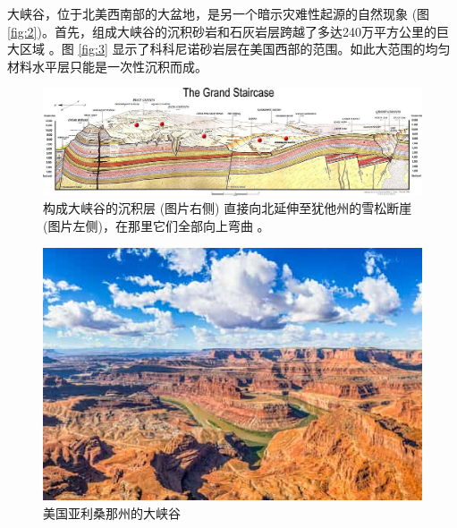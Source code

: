 \documentclass[10pt,twocolumn,letterpaper]{article}
\begin{document}
大峡谷，位于北美西南部的大盆地，是另一个暗示灾难性起源的自然现象 (图 \ref{fig:2})。首先，组成大峡谷的沉积砂岩和石灰岩层跨越了多达240万平方公里的巨大区域 \cite{21}。图 \ref{fig:3} 显示了科科尼诺砂岩层在美国西部的范围。如此大范围的均匀材料水平层只能是一次性沉积而成。

\begin{figure}[t]
\begin{center}
\includegraphics[width=1\textwidth]{Grand_Staircase-big.jpg}
\end{center}
   \caption{构成大峡谷的沉积层 (图片右侧) 直接向北延伸至犹他州的雪松断崖 (图片左侧)，在那里它们全部向上弯曲 \cite{50}。}
\label{fig:4}
\end{figure}

\begin{figure}[t]
\begin{center}
   \includegraphics[width=1\linewidth]{grand-canyon.jpg}
\end{center}
   \caption{美国亚利桑那州的大峡谷 \cite{49}}
\label{fig:2}
\label{fig:onecol}
\end{figure}
\end{document}
